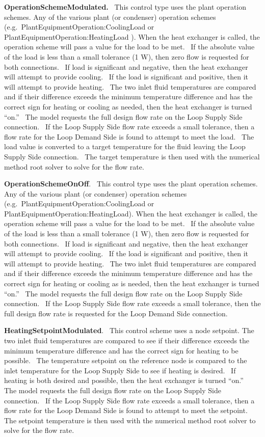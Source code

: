 \textbf{OperationSchemeModulated.}~ This control type uses the plant operation schemes. Any of the various plant (or condenser) operation schemes (e.g.~PlantEquipmentOperation:CoolingLoad or PlantEquipmentOperation:HeatingLoad ). When the heat exchanger is called, the operation scheme will pass a value for the load to be met.~ If the absolute value of the load is less than a small tolerance (1 W), then zero flow is requested for both connections.~ If load is significant and negative, then the heat exchanger will attempt to provide cooling.~ If the load is significant and positive, then it will attempt to provide heating.~ The two inlet fluid temperatures are compared and if their difference exceeds the minimum temperature difference and has the correct sign for heating or cooling as needed, then the heat exchanger is turned ``on.''~ The model requests the full design flow rate on the Loop Supply Side connection.~ If the Loop Supply Side flow rate exceeds a small tolerance, then a flow rate for the Loop Demand Side is found to attempt to meet the load.~ The load value is converted to a target temperature for the fluid leaving the Loop Supply Side connection.~ The target temperature is then used with the numerical method root solver to solve for the flow rate.

\textbf{OperationSchemeOnOff}.~ This control type uses the plant operation schemes. Any of the various plant (or condenser) operation schemes (e.g.~PlantEquipmentOperation:CoolingLoad or PlantEquipmentOperation:HeatingLoad). When the heat exchanger is called, the operation scheme will pass a value for the load to be met.~ If the absolute value of the load is less than a small tolerance (1 W), then zero flow is requested for both connections.~ If load is significant and negative, then the heat exchanger will attempt to provide cooling.~ If the load is significant and positive, then it will attempt to provide heating.~ The two inlet fluid temperatures are compared and if their difference exceeds the minimum temperature difference and has the correct sign for heating or cooling as is needed, then the heat exchanger is turned ``on.''~ The model requests the full design flow rate on the Loop Supply Side connection.~ If the Loop Supply Side flow rate exceeds a small tolerance, then the full design flow rate is requested for the Loop Demand Side connection.

\textbf{HeatingSetpointModulated}.~ This control scheme uses a node setpoint. The two inlet fluid temperatures are compared to see if their difference exceeds the minimum temperature difference and has the correct sign for heating to be possible.~ The temperature setpoint on the reference node is compared to the inlet temperature for the Loop Supply Side to see if heating is desired.~ If heating is both desired and possible, then the heat exchanger is turned ``on.''~ The model requests the full design flow rate on the Loop Supply Side connection.~ If the Loop Supply Side flow rate exceeds a small tolerance, then a flow rate for the Loop Demand Side is found to attempt to meet the setpoint.~ The setpoint temperature is then used with the numerical method root solver to solve for the flow rate.

